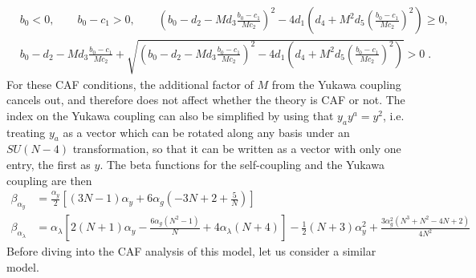 \begin{align}
    &b_0<0,\quad\quad b_0-c_1>0,\quad\quad \left(b_0-d_2-Md_3\frac{b_0-c_1}{Mc_2}\right)^2-4d_1\left(d_4+M^2d_5\left(\frac{b_0-c_1}{Mc_2}\right)^2\right)\geq 0,\\&b_0-d_2- Md_3 \frac{b_0-c_1}{Mc_2}+\sqrt{\left(b_0-d_2 - Md_3 \frac{b_0-c_1}{Mc_2}\right)^2-4d_1\left(d_4+M^2d_5\left(\frac{b_0-c_1}{Mc_2}\right)^2\right)}>0\;.
\end{align}  
For these CAF conditions, the additional factor of $M$ from the Yukawa coupling cancels out, and therefore does not affect whether the theory is CAF or not. 
The index on the Yukawa coupling can also be simplified by using that $y_ay^a=y^2$, i.e. treating $y_a$ as a vector which can be rotated along any basis under an $SU(N-4)$ transformation, so that it can be written as a vector with only one entry, the first as $y$. The beta functions for the self-coupling and the Yukawa coupling are then
\begin{align}
    \beta_{\alpha_y}&= \frac{\alpha_y }{2}\left[(3 N-1)
   \alpha_y+6 \alpha_g \left(-3 N+2+\frac 5N\right)\right]\\
    \beta_{\alpha_\lambda}&=\alpha_\lambda\left[2(N+1)\alpha_y-\frac{6 \alpha_g \left(N^2-1\right)}{N}+4 \alpha_\lambda (N+4)\right]-\frac{1}{2} (N+3)\alpha_y^2+\frac{3 \alpha_g^2 \left(N^3+N^2-4 N+2\right)}{4 N^2} 
\end{align}
Before diving into the CAF analysis of this model, let us consider a similar model.
